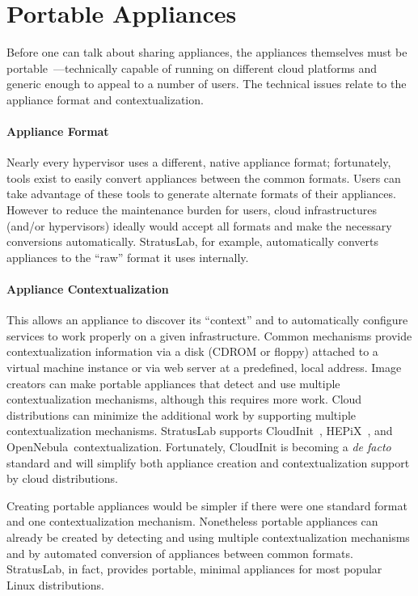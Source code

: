 \section{Portable Appliances}
\label{sec:portable-appliances}

Before one can talk about sharing appliances, the appliances
themselves must be portable~\cite{Petcu}---technically capable of
running on different cloud platforms and generic enough to appeal to a
number of users.  The technical issues relate to the appliance format
and contextualization.

\paragraph*{Appliance Format}
Nearly every hypervisor uses a different, native appliance format;
fortunately, tools exist to easily convert appliances between the
common formats.  Users can take advantage of these tools to generate
alternate formats of their appliances.  However to reduce the
maintenance burden for users, cloud infrastructures (and/or
hypervisors) ideally would accept all formats and make the necessary
conversions automatically.  StratusLab, for example, automatically
converts appliances to the ``raw'' format it uses internally.

\paragraph*{Appliance Contextualization}
This allows an appliance to discover its ``context'' and to
automatically configure services to work properly on a given
infrastructure.  Common mechanisms provide contextualization
information via a disk (CDROM or floppy) attached to a virtual machine
instance or via web server at a predefined, local address.  Image
creators can make portable appliances that detect and use multiple
contextualization mechanisms, although this requires more work.  Cloud
distributions can minimize the additional work by supporting multiple
contextualization mechanisms.  StratusLab supports
CloudInit~\cite{cloudinit}, HEPiX~\cite{hepixbookcontext}, and
OpenNebula~\cite{opennebula}\@ contextualization.  Fortunately,
CloudInit is becoming a {\em de facto} standard and will simplify both
appliance creation and contextualization support by cloud
distributions.

Creating portable appliances would be simpler if there were one
standard format and one contextualization mechanism.  Nonetheless
portable appliances can already be created by detecting and using
multiple contextualization mechanisms and by automated conversion of
appliances between common formats.  StratusLab, in fact, provides
portable, minimal appliances for most popular Linux distributions.
